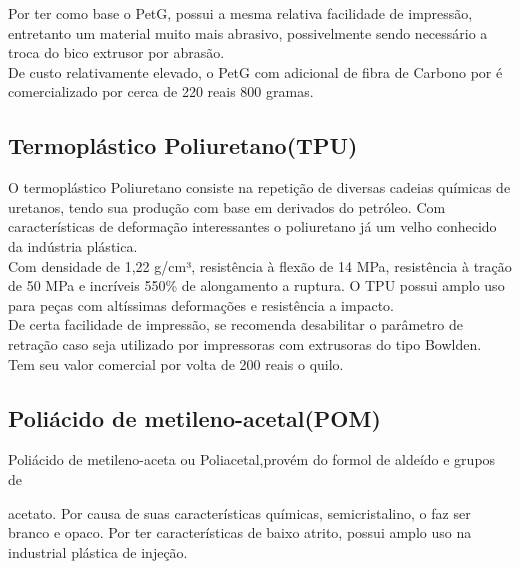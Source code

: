 Por ter como base o PetG, possui a mesma relativa facilidade de impressão, entretanto um material muito mais abrasivo, possivelmente sendo necessário a troca do bico extrusor por abrasão. \\[0.2cm]



De custo relativamente elevado, o PetG com adicional de fibra de Carbono por é comercializado por cerca de 220 reais 800 gramas.\\[0.2cm]



\subsection{Termoplástico Poliuretano(TPU)}



O termoplástico Poliuretano consiste na repetição de diversas cadeias químicas de uretanos, tendo sua produção com base em derivados do petróleo. Com características de deformação interessantes o poliuretano já um velho conhecido da indústria plástica. \\[0.2cm]



Com densidade de 1,22 g/cm³, resistência à flexão de 14 MPa, resistência à tração de 50 MPa e  incríveis 550\% de alongamento a ruptura. O TPU  possui amplo uso para peças com altíssimas deformações e resistência a impacto. \\[0.2cm]



De certa facilidade de impressão, se recomenda desabilitar o parâmetro de retração caso seja utilizado por impressoras com extrusoras do tipo Bowlden. \\[0.2cm]



Tem seu valor comercial por volta de 200 reais o quilo. \\[0.2cm]





\subsection{Poliácido de metileno-acetal(POM)}



Poliácido de metileno-aceta ou Poliacetal,provém do formol de aldeído e grupos de

acetato. Por causa de suas características químicas, semicristalino, o faz ser branco e opaco. Por ter características de baixo atrito, possui amplo uso na industrial plástica de injeção. \\[0.2cm]



